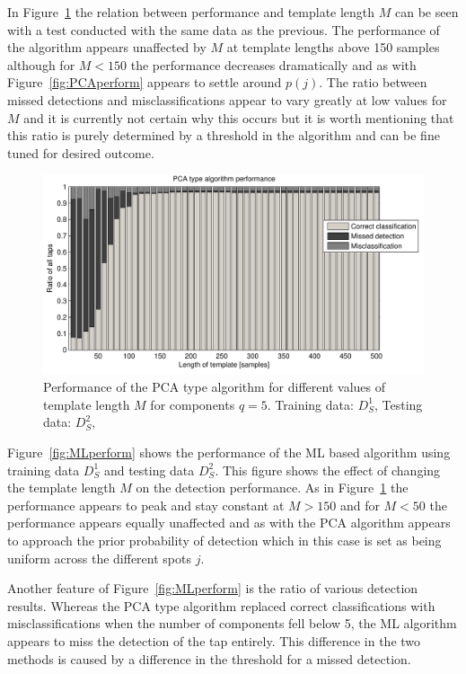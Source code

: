 In Figure~\ref{fig:PCAperformLength} the relation between performance and template length $M$ can be seen with a test conducted with the same data as the previous. The performance of the algorithm appears unaffected by $M$ at template lengths above 150 samples although for $M<150$ the performance decreases dramatically and as with Figure~\ref{fig:PCAperform} appears to settle around $p(j)$. The ratio between missed detections and misclassifications appear to vary greatly at low values for $M$ and it is currently not certain why this occurs but it is worth mentioning that this ratio is purely determined by a threshold in the algorithm and can be fine tuned for desired outcome.

\begin{figure}[!] %
\centering
\includegraphics[width=150mm]{PCAperformLength.pdf}
\caption{Performance of the PCA type algorithm for different values of template length $M$ for components $q=5$. Training data: $D^1_S$, Testing data: $D^2_S$,}\label{fig:PCAperformLength}
\end{figure}

Figure~\ref{fig:MLperform} shows the performance of the ML based algorithm using training data $D^1_S$ and testing data $D^2_S$. This figure shows the effect of changing the template length $M$ on the detection performance. As in Figure~\ref{fig:PCAperformLength} the performance appears to peak and stay constant at $M>150$ and for $M<50$ the performance appears equally unaffected and as with the PCA algorithm appears to approach the prior probability of detection which in this case is set as being uniform across the different spots $j$.

Another feature of Figure~\ref{fig:MLperform} is the ratio of various detection results. Whereas the PCA type algorithm replaced correct classifications with misclassifications when the number of components fell below 5, the ML algorithm appears to miss the detection of the tap entirely. This difference in the two methods is caused by a difference in the threshold for a missed detection.


